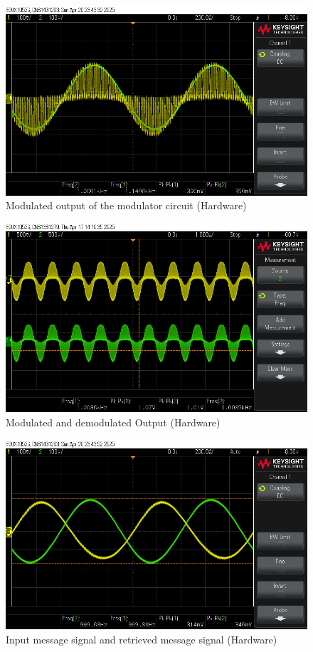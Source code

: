 \documentclass[conference]{IEEEtran}
\begin{document}
\begin{figure}
    \centering
    \includegraphics[width=1\linewidth]{Images/modulated_out_circuit.png}
    \caption{Modulated output of the modulator circuit (Hardware)}
\end{figure}

\begin{figure}
    \centering
    \includegraphics[width=1\linewidth]{Images/modulated_demodulated.png}
    \caption{Modulated and demodulated Output (Hardware)}
\end{figure}

\begin{figure}
    \centering
    \includegraphics[width=1\linewidth]{Images/final_out_circuit.png}
    \caption{Input message signal and retrieved message signal (Hardware)}
\end{figure}
\end{document}
